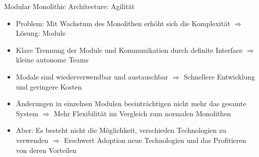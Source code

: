 \begin{frame}{Modular Monolithic Architecture: Agilität}
    \begin{itemize}
        \item Problem: Mit Wachstum des Monolithen erhöht sich die Komplexität $\Rightarrow$ Lösung: Module
        \item Klare Trennung der Module und Kommunikation durch definite Interface $\Rightarrow$ kleine autonome Teams
        \item Modale sind wiederverwendbar und austauschbar $\Rightarrow$ Schnellere Entwicklung und geringere Kosten
        \item Änderungen in einzelnen Modulen beeinträchtigen nicht mehr das gesamte System $\Rightarrow$ Mehr Flexibilität im Vergleich zum normalen Monolithen
        \item Aber: Es besteht nicht die Möglichkeit, verschieden Technologien zu verwenden $\Rightarrow$ Erschwert Adoption neue Technologien und das Profitieren von deren Vorteilen
    \end{itemize}
\end{frame}
